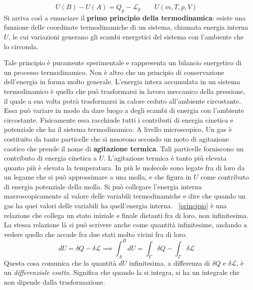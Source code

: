 \documentclass[10pt,a4paper]{book}
\begin{document}
\begin{equation}
	\label{principio}
	\boxed{U(B)-U(A) = Q_p - \mathcal{L}_p \qquad U(m,T,p,V)}
\end{equation}
Si arriva così a enunciare il \textbf{primo principio della termodinamica}: esiste una funzione delle coordinate termodinamiche di un sistema, chiamata energia interna $U$, le cui variazioni generano gli scambi energetici del sistema con l'ambiente che lo circonda.

Tale principio è puramente sperimentale e rappresenta un bilancio energetico di un processo termodinamico. Non è altro che un principio di conservazione dell'energia in forma molto generale. L'energia intera accumulata in un sistema termodinamico è quella che può trasformarsi in lavoro meccanico della pressione, il quale a sua volta potrà trasformarsi in calore ceduto all'ambiente circostante. Essa può variare in modo da dare luogo a degli scambi di energia con l'ambiente circostante. Fisicamente essa racchiude tutti i contributi di energia cinetica e potenziale che ha il sistema termodinamico.
A livello microscopico, Un gas è costituito da tante particelle che si muovono secondo un moto di agitazione caotico che prende il nome di \textbf{agitazione termica}. Tali particelle forniscono un contributo di energia cinetica a $U$. L'agitazione termica è tanto più elevata quanto più è elevata la temperatura.
In più le molecole sono legate fra di loro da un legame che si può approssimare a una molla, e che figura in $U$ come contributo di energia potenziale della molla.
Si può collegare l'energia interna macroscopicamente al valore delle variabili termodinamiche e dire che quando un gas ha quei valori delle variabili ha quell'energia interna.
~\eqref{principio} è una relazione che collega un stato iniziale e finale distanti fra di loro, non infinitesima. La stessa relazione là si può scrivere anche come quantità infinitesime, andando a vedere quello che accade fra due stati molto vicini fra di loro.
\[
	dU = \delta Q - \delta\mathcal{L} \implies \int_A^B dU = \int_{\Gamma} \delta Q - \int_{\Gamma} \delta\mathcal{L}
\]
Questa cosa comunica che la quantità $dU$ infinitesima, a differenza di $\delta Q$ e $\delta\mathcal{L}$, è un \emph{differenziale esatto}. Significa che quando la si integra, si ha un integrale che non dipende dalla trasformazione.
\end{document}
